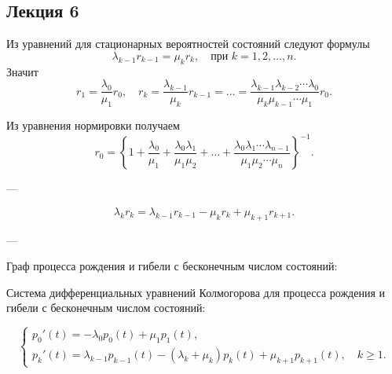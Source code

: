 
\subsection{Лекция 6}

Из уравнений для стационарных вероятностей состояний следуют формулы
\[
	\lambda_{k-1} r_{k-1} = \mu_k r_k, \quad \text{при } k = 1, 2, \ldots, n.
\]
Значит
\[
	r_1 = \frac{\lambda_0}{\mu_1} r_0, \quad
	r_k = \frac{\lambda_{k-1}}{\mu_k} r_{k-1} = \ldots =
	\frac{\lambda_{k-1} \lambda_{k-2} \cdots \lambda_0}{\mu_k \mu_{k-1} \cdots \mu_1} r_0.
\]

Из уравнения нормировки получаем
\[
	r_0 =
	\left\{
	1 +
	\frac{\lambda_0}{\mu_1} +
	\frac{\lambda_0 \lambda_1}{\mu_1 \mu_2} +
	\ldots +
	\frac{\lambda_0 \lambda_1 \cdots \lambda_{n-1}}{\mu_1 \mu_2 \cdots \mu_n}
	\right\}^{-1}.
\]

---

\[
	\lambda_k r_k = \lambda_{k-1} r_{k-1} - \mu_k r_k + \mu_{k+1} r_{k+1}.
\]

---

Граф процесса рождения и гибели с бесконечным числом состояний:

\begin{center}
\end{center}

Система дифференциальных уравнений Колмогорова для процесса рождения и гибели
с бесконечным числом состояний:

\[
	\begin{cases}
		p_0'(t) = -\lambda_0 p_0(t) + \mu_1 p_1(t), \\[6pt]
		p_k'(t) = \lambda_{k-1} p_{k-1}(t)
		- (\lambda_k + \mu_k) p_k(t)
		+ \mu_{k+1} p_{k+1}(t), \quad k \ge 1.
	\end{cases}
\]

